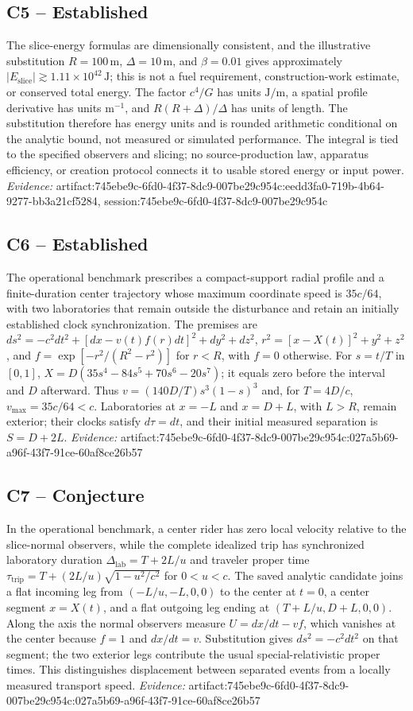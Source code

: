 \documentclass[11pt]{article}
\begin{document}
\subsection{C5 -- Established}
The slice-energy formulas are dimensionally consistent, and the illustrative substitution $R=100\,\mathrm{m}$, $\Delta=10\,\mathrm{m}$, and $\beta=0.01$ gives approximately $|E_{\mathrm{slice}}|\gtrsim1.11\times10^{42}\,\mathrm{J}$; this is not a fuel requirement, construction-work estimate, or conserved total energy.
The factor $c^4/G$ has units $\mathrm{J/m}$, a spatial profile derivative has units $\mathrm{m}^{-1}$, and $R(R+\Delta)/\Delta$ has units of length. The substitution therefore has energy units and is rounded arithmetic conditional on the analytic bound, not measured or simulated performance. The integral is tied to the specified observers and slicing; no source-production law, apparatus efficiency, or creation protocol connects it to usable stored energy or input power.
\textit{Evidence: }artifact:745ebe9c-6fd0-4f37-8dc9-007be29c954c:eedd3fa0-719b-4b64-9277-bb3a21cf5284, session:745ebe9c-6fd0-4f37-8dc9-007be29c954c
\subsection{C6 -- Established}
The operational benchmark prescribes a compact-support radial profile and a finite-duration center trajectory whose maximum coordinate speed is $35c/64$, with two laboratories that remain outside the disturbance and retain an initially established clock synchronization.
The premises are $ds^2=-c^2dt^2+[dx-v(t)f(r)dt]^2+dy^2+dz^2$, $r^2=[x-X(t)]^2+y^2+z^2$, and $f=\exp[-r^2/(R^2-r^2)]$ for $r<R$, with $f=0$ otherwise. For $s=t/T$ in $[0,1]$, $X=D(35s^4-84s^5+70s^6-20s^7)$; it equals zero before the interval and $D$ afterward. Thus $v=(140D/T)s^3(1-s)^3$ and, for $T=4D/c$, $v_{\max}=35c/64<c$. Laboratories at $x=-L$ and $x=D+L$, with $L>R$, remain exterior; their clocks satisfy $d\tau=dt$, and their initial measured separation is $S=D+2L$.
\textit{Evidence: }artifact:745ebe9c-6fd0-4f37-8dc9-007be29c954c:027a5b69-a96f-43f7-91ce-60af8ce26b57
\subsection{C7 -- Conjecture}
In the operational benchmark, a center rider has zero local velocity relative to the slice-normal observers, while the complete idealized trip has synchronized laboratory duration $\Delta_{\mathrm{lab}}=T+2L/u$ and traveler proper time $\tau_{\mathrm{trip}}=T+(2L/u)\sqrt{1-u^2/c^2}$ for $0<u<c$.
The saved analytic candidate joins a flat incoming leg from $(-L/u,-L,0,0)$ to the center at $t=0$, a center segment $x=X(t)$, and a flat outgoing leg ending at $(T+L/u,D+L,0,0)$. Along the axis the normal observers measure $U=dx/dt-vf$, which vanishes at the center because $f=1$ and $dx/dt=v$. Substitution gives $ds^2=-c^2dt^2$ on that segment; the two exterior legs contribute the usual special-relativistic proper times. This distinguishes displacement between separated events from a locally measured transport speed.
\textit{Evidence: }artifact:745ebe9c-6fd0-4f37-8dc9-007be29c954c:027a5b69-a96f-43f7-91ce-60af8ce26b57
\end{document}
